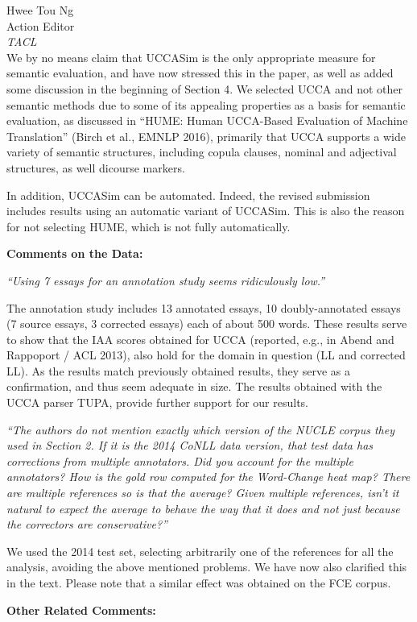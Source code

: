 \documentclass[11pt,letterpaper]{letter}
\begin{document}
\begin{letter}{%
Hwee Tou Ng\\
Action Editor\\
{\em TACL}\\
}
We by no means claim that UCCASim is the only appropriate measure for semantic evaluation, and have now stressed this in the paper, as well as added some discussion in the beginning of Section 4. We selected UCCA and not other semantic methods due to some of its appealing properties as a basis for semantic evaluation, as discussed in ``HUME: Human UCCA-Based Evaluation of Machine Translation'' (Birch et al., EMNLP 2016), primarily that UCCA supports a wide variety of semantic structures, including copula clauses, nominal and adjectival structures, as well dicourse markers.

In addition, UCCASim can be automated. Indeed, the revised submission includes results using an automatic variant of UCCASim. This is also the reason for not selecting HUME, which is not fully automatically.


\vspace{.5cm}
{\large\bf Comments on the Data:}

\emph{``Using 7 essays for an annotation study seems ridiculously low.''}

The annotation study includes 13 annotated essays, 10 doubly-annotated essays (7 source essays, 3 corrected essays) each of about 500 words. These results serve to show that the IAA scores obtained for UCCA (reported, e.g., in Abend and Rappoport / ACL 2013), also hold for the domain in question (LL and corrected LL). As the results match previously obtained results, they serve as a confirmation, and thus seem adequate in size. The results obtained with the UCCA parser TUPA, provide further support for our results.

\emph{``The authors do not mention exactly which version of the NUCLE corpus
	they used in Section 2. If it is the 2014 CoNLL data version, that test data
	has corrections from multiple annotators. Did you account for the multiple
	annotators? How is the gold row computed for the Word-Change heat map? There
	are multiple references so is that the average? Given multiple references,
	isn't it natural to expect the average to behave the way that it does and
	not just because the correctors are conservative?''}

We used the 2014 test set, selecting arbitrarily one of the references for all the analysis, avoiding the above mentioned problems. We have now also clarified this in the text. Please note that a similar effect was obtained on the FCE corpus.

\vspace{.5cm}
{\large\bf Other Related Comments:}
	

\end{letter}
\end{document}
